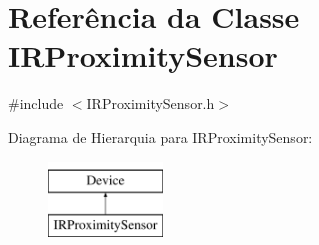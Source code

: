 \hypertarget{classIRProximitySensor}{\section{Referência da Classe I\-R\-Proximity\-Sensor}
\label{classIRProximitySensor}
}


{\ttfamily \#include $<$I\-R\-Proximity\-Sensor.\-h$>$}

Diagrama de Hierarquia para I\-R\-Proximity\-Sensor\-:\begin{figure}[H]
\begin{center}
\leavevmode
\includegraphics[height=2.000000cm]{classIRProximitySensor}
\end{center}
\end{figure}
